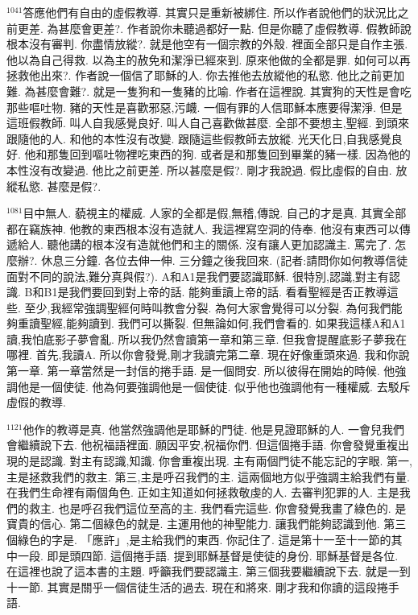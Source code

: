 \documentclass{book}
\begin{document}
$^{1041}$答應他們有自由的虛假教導.
其實只是重新被綁住.
所以作者說他們的狀況比之前更差.
為甚麼會更差?.
作者說你未聽過都好一點.
但是你聽了虛假教導.
假教師說根本沒有審判.
你盡情放縱?.
就是他空有一個宗教的外殼.
裡面全部只是自作主張.
他以為自己得救.
以為主的赦免和潔淨已經來到.
原來他做的全都是罪.
如何可以再拯救他出來?.
作者說一個信了耶穌的人.
你去推他去放縱他的私慾.
他比之前更加難.
為甚麼會難?.
就是一隻狗和一隻豬的比喻.
作者在這裡說.
其實狗的天性是會吃那些嘔吐物.
豬的天性是喜歡邪惡,污衊.
一個有罪的人信耶穌本應要得潔淨.
但是這班假教師.
叫人自我感覺良好.
叫人自己喜歡做甚麼.
全部不要想主,聖經.
到頭來跟隨他的人.
和他的本性沒有改變.
跟隨這些假教師去放縱.
光天化日,自我感覺良好.
他和那隻回到嘔吐物裡吃東西的狗.
或者是和那隻回到畢業的豬一樣.
因為他的本性沒有改變過.
他比之前更差.
所以甚麼是假?.
剛才我說過.
假比虛假的自由.
放縱私慾.
甚麼是假?.

$^{1081}$目中無人.
藐視主的權威.
人家的全都是假,無稽,傳說.
自己的才是真.
其實全部都在竊族神.
他教的東西根本沒有造就人.
我這裡寫空洞的侍奉.
他沒有東西可以傳遞給人.
聽他講的根本沒有造就他們和主的關係.
沒有讓人更加認識主.
罵完了.
怎麼辦?.
休息三分鐘.
各位去伸一伸.
三分鐘之後我回來.
(記者:請問你如何教導信徒面對不同的說法,難分真與假?).
A和A1是我們要認識耶穌.
很特別,認識,對主有認識.
B和B1是我們要回到對上帝的話.
能夠重讀上帝的話.
看看聖經是否正教導這些.
至少,我經常強調聖經何時叫教會分裂.
為何大家會覺得可以分裂.
為何我們能夠重讀聖經,能夠讀到.
我們可以撕裂.
但無論如何,我們會看的.
如果我這樣A和A1讀,我怕底影子夢會亂.
所以我仍然會讀第一章和第三章.
但我會提醒底影子夢我在哪裡.
首先,我讀A.
所以你會發覺,剛才我讀完第二章.
現在好像重頭來過.
我和你說第一章.
第一章當然是一封信的捲手語.
是一個問安.
所以彼得在開始的時候.
他強調他是一個使徒.
他為何要強調他是一個使徒.
似乎他也強調他有一種權威.
去駁斥虛假的教導.

$^{1121}$他作的教導是真.
他當然強調他是耶穌的門徒.
他是見證耶穌的人.
一會兒我們會繼續說下去.
他祝福語裡面.
願因平安,祝福你們.
但這個捲手語.
你會發覺重複出現的是認識.
對主有認識,知識.
你會重複出現.
主有兩個門徒不能忘記的字眼.
第一,主是拯救我們的救主.
第三,主是呼召我們的主.
這兩個地方似乎強調主給我們有量.
在我們生命裡有兩個角色.
正如主知道如何拯救敬虔的人.
去審判犯罪的人.
主是我們的救主.
也是呼召我們這位至高的主.
我們看完這些.
你會發覺我畫了綠色的.
是寶貴的信心.
第二個綠色的就是.
主運用他的神聖能力.
讓我們能夠認識到他.
第三個綠色的字是.
「應許」,是主給我們的東西.
你記住了.
這是第十一至十一節的其中一段.
即是頭四節.
這個捲手語.
提到耶穌基督是使徒的身份.
耶穌基督是各位.
在這裡也說了這本書的主題.
呼籲我們要認識主.
第三個我要繼續說下去.
就是一到十一節.
其實是關乎一個信徒生活的過去.
現在和將來.
剛才我和你讀的這段捲手語.
\end{document}
